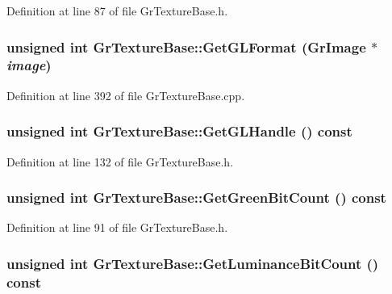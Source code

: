 \begin{CompactItemize}
Definition at line 87 of file GrTextureBase.h.\hypertarget{class_gr_texture_base_ac63f0e0d108d3fa26b07222f2655f7a}{
\subsubsection[{GetGLFormat}]{\setlength{\rightskip}{0pt plus 5cm}unsigned int GrTextureBase::GetGLFormat ({\bf GrImage} $\ast$ {\em image})}}
\label{class_gr_texture_base_ac63f0e0d108d3fa26b07222f2655f7a}




Definition at line 392 of file GrTextureBase.cpp.\hypertarget{class_gr_texture_base_eeb990c8830fe5d9f49224ab211df183}{
\subsubsection[{GetGLHandle}]{\setlength{\rightskip}{0pt plus 5cm}unsigned int GrTextureBase::GetGLHandle () const}}
\label{class_gr_texture_base_eeb990c8830fe5d9f49224ab211df183}




Definition at line 132 of file GrTextureBase.h.\hypertarget{class_gr_texture_base_f8b32cd3c21488e40e0667d6a253320a}{
\subsubsection[{GetGreenBitCount}]{\setlength{\rightskip}{0pt plus 5cm}unsigned int GrTextureBase::GetGreenBitCount () const}}
\label{class_gr_texture_base_f8b32cd3c21488e40e0667d6a253320a}




Definition at line 91 of file GrTextureBase.h.\hypertarget{class_gr_texture_base_62deff3983812f7ff630ceb7021cd7b8}{
\subsubsection[{GetLuminanceBitCount}]{\setlength{\rightskip}{0pt plus 5cm}unsigned int GrTextureBase::GetLuminanceBitCount () const}}
\label{class_gr_texture_base_62deff3983812f7ff630ceb7021cd7b8}





\end{CompactItemize}
